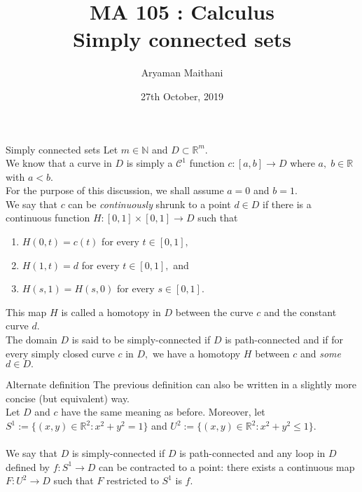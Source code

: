 \documentclass[handout, aspectratio=169]{beamer}
\title{MA 105 : Calculus\\ Simply connected sets}  %
\author{Aryaman Maithani}
\date[27-10-2019]{27th October, 2019}               %
\institute[IITB]{IIT Bombay}
\begin{document}
\begin{frame}
	\titlepage
\end{frame}
\begin{frame}{Simply connected sets}
	Let $m \in \mathbb{N}$ and $D \subset \mathbb{R}^m.$\\
	We know that a curve in $D$ is simply a $\mathcal{C}^1$ function $c:[a, b]\to D$ where $a,\;b\in\mathbb{R}$ with $a < b.$\\
	For the purpose of this discussion, we shall assume $a = 0$ and $b = 1.$\\
	We say that $c$ can be \emph{continuously} shrunk to a point $d \in D$ if there is a continuous function $H:[0, 1]\times[0, 1]\to D$ such that
	\begin{enumerate} 
		\item $H(0, t) = c(t)$ for every $t \in [0, 1],$
		\item $H(1, t) = d$ for every $t \in [0, 1],$ and
		\item $H(s, 1) = H(s, 0)$ for every $s \in [0, 1].$
	\end{enumerate}
	This map $H$ is called a homotopy in $D$ between the curve $c$ and the constant curve $d.$\\
	The domain $D$ is said to be simply-connected if $D$ is path-connected and if for every simply closed curve $c$ in $D,$ we have a homotopy $H$ between $c$ and \emph{some} $d \in D.$
\end{frame}
\begin{frame}{Alternate definition}
	The previous definition can also be written in a slightly more concise (but equivalent) way.\\
	Let $D$ and $c$ have the same meaning as before. Moreover, let $S^1 := \{(x, y) \in \mathbb{R}^2 : x^2 + y^2 = 1\}$ and $U^2 := \{(x, y) \in \mathbb{R}^2 : x^2 + y^2 \le 1\}.$\\~\\
	We say that $D$ is simply-connected if $D$ is path-connected and any loop in $D$ defined by $f:S^1 \to D$ can be contracted to a point: there exists a continuous map $F:U^2 \to D$ such that $F$ restricted to $S^1$ is $f.$
\end{frame}
\end{document}
